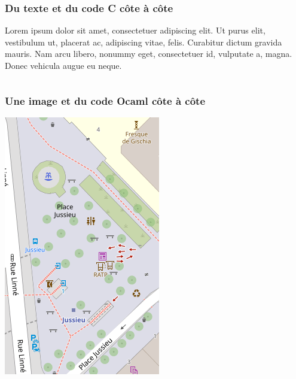 \begin{frame}
  \frametitle{Du texte et du code C côte à côte\esp}
  
  \begin{minipage}{0.4\textwidth}
    Lorem ipsum dolor sit amet, consectetuer adipiscing elit. 
    Ut purus elit, vestibulum ut, placerat ac, adipiscing vitae, felis. 
    Curabitur dictum gravida mauris. 
    Nam arcu libero, nonummy eget, consectetuer id, vulputate a, magna. 
    Donec vehicula augue eu neque. 
  \end{minipage}
  \begin{minipage}{0.58\textwidth}
    \inputminted[firstline=3, lastline=8,firstnumber=1]{c}{pour_exemples/main.c}
  \end{minipage}
\end{frame}

\begin{frame}
  \frametitle{Une image et du code Ocaml côte à côte\esp}
  
  \begin{minipage}{0.28\textwidth}
    \includegraphics[scale=0.35]{pour_exemples/mini_plan.png}
  \end{minipage}
  \begin{minipage}{0.68\textwidth}
    \inputminted[firstline=1, lastline=10,firstnumber=1]{ocaml}{pour_exemples/test.ml}
  \end{minipage}
\end{frame}

